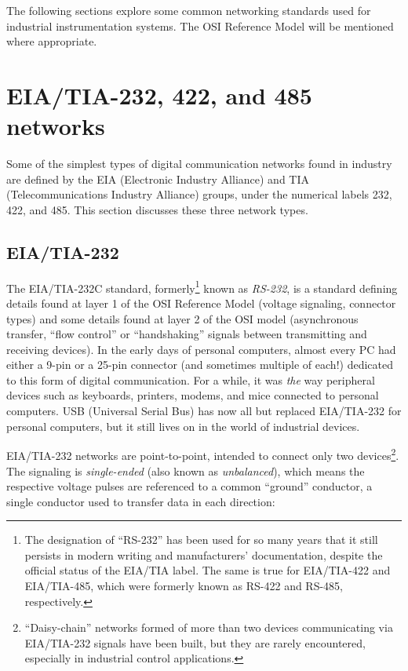 \vskip 10pt

The following sections explore some common networking standards used for industrial instrumentation systems.  The OSI Reference Model will be mentioned where appropriate.












\filbreak
\section{EIA/TIA-232, 422, and 485 networks}

Some of the simplest types of digital communication networks found in industry are defined by the EIA (Electronic Industry Alliance) and TIA (Telecommunications Industry Alliance) groups, under the numerical labels 232, 422, and 485.  This section discusses these three network types.


\filbreak
\subsection{EIA/TIA-232}

The EIA/TIA-232C standard, formerly\footnote{The designation of ``RS-232'' has been used for so many years that it still persists in modern writing and manufacturers' documentation, despite the official status of the EIA/TIA label.  The same is true for EIA/TIA-422 and EIA/TIA-485, which were formerly known as RS-422 and RS-485, respectively.} known as \textit{RS-232}, is a standard defining details found at layer 1 of the OSI Reference Model (voltage signaling, connector types) and some details found at layer 2 of the OSI model (asynchronous transfer, ``flow control'' or ``handshaking'' signals between transmitting and receiving devices).  In the early days of personal computers, almost every PC had either a 9-pin or a 25-pin connector (and sometimes multiple of each!) dedicated to this form of digital communication.  For a while, it was \textit{the} way peripheral devices such as keyboards, printers, modems, and mice connected to personal computers.  USB (Universal Serial Bus) has now all but replaced EIA/TIA-232 for personal computers, but it still lives on in the world of industrial devices.        

EIA/TIA-232 networks are point-to-point, intended to connect only two devices\footnote{``Daisy-chain'' networks formed of more than two devices communicating via EIA/TIA-232 signals have been built, but they are rarely encountered, especially in industrial control applications.}.  The signaling is \textit{single-ended} (also known as \textit{unbalanced}), which means the respective voltage pulses are referenced to a common ``ground'' conductor, a single conductor used to transfer data in each direction:    

